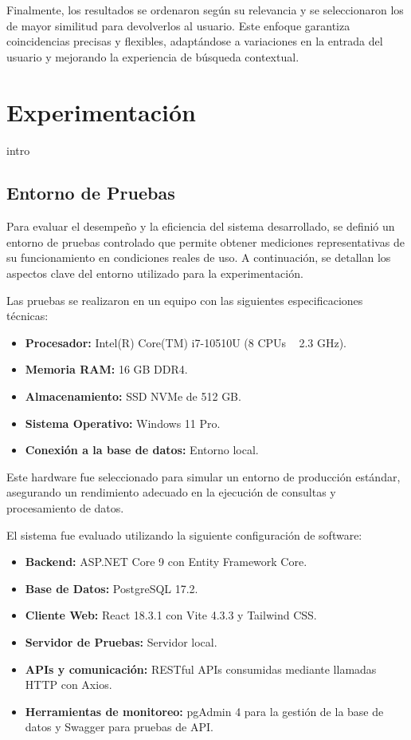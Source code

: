 Finalmente, los resultados se ordenaron según su relevancia y se seleccionaron los de mayor similitud para devolverlos al usuario. Este enfoque garantiza coincidencias precisas y flexibles, adaptándose a variaciones en la entrada del usuario 
y mejorando la experiencia de búsqueda contextual.



\section{Experimentación}
intro

\subsection{Entorno de Pruebas}
Para evaluar el desempeño y la eficiencia del sistema desarrollado, se definió un entorno de pruebas controlado 
que permite obtener mediciones representativas de su funcionamiento en condiciones reales de uso. A continuación, 
se detallan los aspectos clave del entorno utilizado para la experimentación.

Las pruebas se realizaron en un equipo con las siguientes especificaciones técnicas:

\begin{itemize}
    \item \textbf{Procesador:} Intel(R) Core(TM) i7-10510U (8 CPUs ~ 2.3 GHz).
    \item \textbf{Memoria RAM:} 16 GB DDR4.
    \item \textbf{Almacenamiento:} SSD NVMe de 512 GB.
    \item \textbf{Sistema Operativo:} Windows 11 Pro.
    \item \textbf{Conexión a la base de datos:} Entorno local.
\end{itemize}

Este hardware fue seleccionado para simular un entorno de producción estándar, asegurando un rendimiento 
adecuado en la ejecución de consultas y procesamiento de datos.

El sistema fue evaluado utilizando la siguiente configuración de software:

\begin{itemize}
    \item \textbf{Backend:} ASP.NET Core 9 con Entity Framework Core.
    \item \textbf{Base de Datos:} PostgreSQL 17.2.
    \item \textbf{Cliente Web:} React 18.3.1 con Vite 4.3.3 y Tailwind CSS.
    \item \textbf{Servidor de Pruebas:} Servidor local.
    \item \textbf{APIs y comunicación:} RESTful APIs consumidas mediante llamadas HTTP con Axios.
    \item \textbf{Herramientas de monitoreo:} pgAdmin 4 para la gestión de la base de datos y Swagger para pruebas de API.
\end{itemize}

